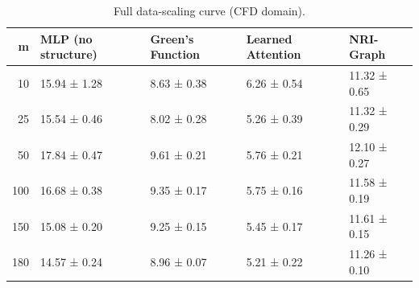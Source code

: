 \begin{table}
\caption{Full data-scaling curve (CFD domain).}
\label{tab:data-scaling-full}
\begin{tabular}{rllll}
\toprule
m & MLP (no structure) & Green's Function & Learned Attention & NRI-Graph \\
\midrule
10 & 15.94 ± 1.28 & 8.63 ± 0.38 & 6.26 ± 0.54 & 11.32 ± 0.65 \\
25 & 15.54 ± 0.46 & 8.02 ± 0.28 & 5.26 ± 0.39 & 11.32 ± 0.29 \\
50 & 17.84 ± 0.47 & 9.61 ± 0.21 & 5.76 ± 0.21 & 12.10 ± 0.27 \\
100 & 16.68 ± 0.38 & 9.35 ± 0.17 & 5.75 ± 0.16 & 11.58 ± 0.19 \\
150 & 15.08 ± 0.20 & 9.25 ± 0.15 & 5.45 ± 0.17 & 11.61 ± 0.15 \\
180 & 14.57 ± 0.24 & 8.96 ± 0.07 & 5.21 ± 0.22 & 11.26 ± 0.10 \\
\bottomrule
\end{tabular}
\end{table}
